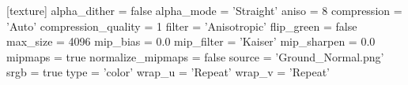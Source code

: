 [texture]
alpha_dither = false
alpha_mode = 'Straight'
aniso = 8
compression = 'Auto'
compression_quality = 1
filter = 'Anisotropic'
flip_green = false
max_size = 4096
mip_bias = 0.0
mip_filter = 'Kaiser'
mip_sharpen = 0.0
mipmaps = true
normalize_mipmaps = false
source = 'Ground_Normal.png'
srgb = true
type = 'color'
wrap_u = 'Repeat'
wrap_v = 'Repeat'